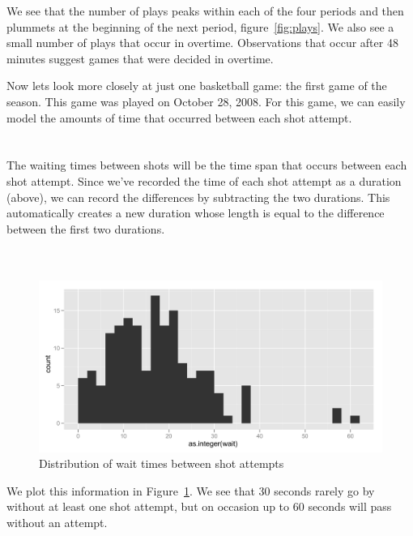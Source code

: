 \documentclass[article]{jss}
\begin{document}
We see that the number of plays peaks within each of the four periods and then plummets at the beginning of the next period, figure~\ref{fig:plays}. We also see a small number of plays that occur in overtime. Observations that occur after 48 minutes suggest games that were decided in overtime.

Now lets look more closely at just one basketball game: the first game of the season. This game was played on October 28, 2008. For this game, we can easily model the amounts of time that occurred between each shot attempt.\\

\\
\\

The waiting times between shots will be the time span that occurs between each shot attempt. Since we've recorded the time of each shot attempt as a duration (above), we can record the differences by subtracting the two durations. This automatically creates a new duration whose length is equal to the difference between the first two durations.\\

\\
\\

\begin{figure}[htpb]
  \centering
  \includegraphics[width=\textwidth]{wait-histogram.png}        
  \caption{Distribution of wait times between shot attempts}
  \label{fig:waits}
\end{figure}

We plot this information in Figure~\ref{fig:waits}. We see that 30 seconds rarely go by without at least one shot attempt, but on occasion up to 60 seconds will pass without an attempt.
\end{document}
